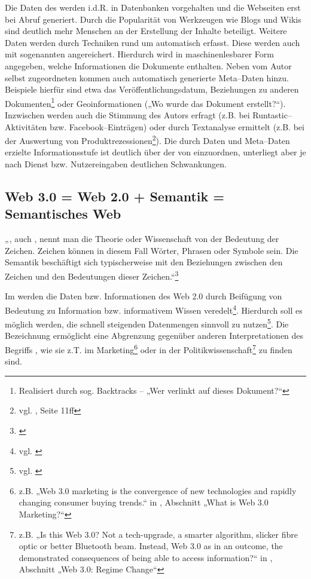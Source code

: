 Die Daten des  werden i.d.R. in Datenbanken vorgehalten und die Webseiten erst bei Abruf generiert. Durch die Popularität von Werkzeugen wie Blogs und Wikis sind deutlich mehr Menschen an der Erstellung der Inhalte beteiligt. Weitere Daten werden durch Techniken rund um  automatisch erfasst. Diese werden auch mit sogenannten  angereichert. Hierdurch wird in maschinenlesbarer Form angegeben, welche Informationen die Dokumente enthalten. Neben vom Autor selbst zugeordneten  kommen auch automatisch generierte Meta--Daten hinzu. Beispiele hierfür sind etwa das Veröffentlichungsdatum, Beziehungen zu anderen Dokumenten\footnote{Realisiert durch sog. Backtracks -- „Wer verlinkt auf dieses Dokument?“} oder Geoinformationen („Wo wurde das Dokument erstellt?“). Inzwischen werden auch die Stimmung des Autors erfragt (z.B. bei Runtastic–Aktivitäten bzw. Facebook--Einträgen) oder durch Textanalyse ermittelt (z.B. bei der Auswertung von Produktrezessionen\footnote{vgl. \cite{sprejz}, Seite 11ff}). Die durch Daten und Meta--Daten erzielte Informationsstufe ist deutlich über der von  einzuordnen, unterliegt aber je nach Dienst bzw. Nutzereingaben deutlichen Schwankungen.

\subsection{Web 3.0 = Web 2.0 + Semantik = Semantisches Web}

„, auch , nennt man die Theorie oder Wissenschaft von der Bedeutung der Zeichen. Zeichen können in diesem Fall Wörter, Phrasen oder Symbole sein. Die Semantik beschäftigt sich typischerweise mit den Beziehungen zwischen den Zeichen und den Bedeutungen dieser Zeichen.“\footnote{\cite{wp:semantik}}

Im  werden die Daten bzw. Informationen des Web 2.0 durch Beifügung von Bedeutung zu Information bzw. informativem Wissen veredelt\footnote{vgl. \cite{nyt:markoff}}. Hierdurch soll es möglich werden, die schnell steigenden Datenmengen sinnvoll zu nutzen\footnote{vgl. \cite{tsp:tolksdorf}}. Die Bezeichnung  ermöglicht eine Abgrenzung gegenüber anderen Interpretationen des Begriffs , wie sie z.T. im Marketing\footnote{z.B. „Web 3.0 marketing is the convergence of new technologies and rapidly changing consumer buying trends.“ in \cite{web3market}, Abschnitt „What is Web 3.0 Marketing?“} oder in der Politikwissenschaft\footnote{z.B. „Is this Web 3.0? Not a tech-upgrade, a smarter algorithm, slicker fibre optic or better Bluetooth beam. Instead, Web 3.0 as in an outcome, the demonstrated consequences of being able to access information?“ in \cite{web3pol}, Abschnitt „Web 3.0: Regime Change“} zu finden sind.

